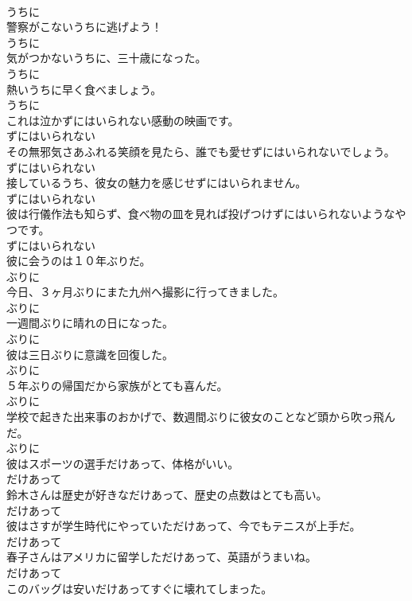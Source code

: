 \documentclass[8pt]{extreport}
\begin{document}
\begin{CJK}{UTF8}{min}
\\	うちに	
\\	警察がこないうちに逃げよう！	
\\	うちに	
\\	気がつかないうちに、三十歳になった。	
\\	うちに	
\\	熱いうちに早く食べましょう。	
\\	うちに	
\\	これは泣かずにはいられない感動の映画です。	
\\	ずにはいられない	
\\	その無邪気さあふれる笑顔を見たら、誰でも愛せずにはいられないでしょう。	
\\	ずにはいられない	
\\	接しているうち、彼女の魅力を感じせずにはいられません。	
\\	ずにはいられない	
\\	彼は行儀作法も知らず、食べ物の皿を見れば投げつけずにはいられないようなやつです。	
\\	ずにはいられない	
\\	彼に会うのは１０年ぶりだ。	
\\	ぶりに	
\\	今日、３ヶ月ぶりにまた九州へ撮影に行ってきました。	
\\	ぶりに	
\\	一週間ぶりに晴れの日になった。	
\\	ぶりに	
\\	彼は三日ぶりに意識を回復した。	
\\	ぶりに	
\\	５年ぶりの帰国だから家族がとても喜んだ。	
\\	ぶりに	
\\	学校で起きた出来事のおかげで、数週間ぶりに彼女のことなど頭から吹っ飛んだ。	
\\	ぶりに	
\\	彼はスポーツの選手だけあって、体格がいい。	
\\	だけあって	
\\	鈴木さんは歴史が好きなだけあって、歴史の点数はとても高い。	
\\	だけあって	
\\	彼はさすが学生時代にやっていただけあって、今でもテニスが上手だ。	
\\	だけあって	
\\	春子さんはアメリカに留学しただけあって、英語がうまいね。	
\\	だけあって	
\\	このバッグは安いだけあってすぐに壊れてしまった。	

\end{CJK}
\end{document}
